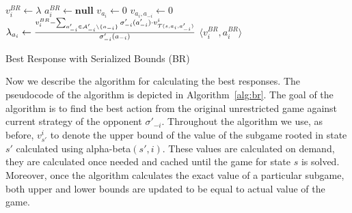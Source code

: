 \begin{algorithm2e}[t]
\small
{}
$v^{BR}_i \leftarrow \lambda$ \;
$a_i^{BR} \leftarrow \textbf{null}$ \;
 {%
	$v_{a_i} \leftarrow 0$\;
	 {\label{alg:br:opp}
    $v_{a_i,a_{-i}} \leftarrow 0$\;
		$\lambda_{a_i} \leftarrow \frac{v_i^{BR} - \sum_{a'_{-i} \in \mathcal{A}'_{-i} \setminus \lbrace a_{-i} \rbrace} \sigma'_{-i}(a'_{-i}) \cdot v^i_{\mathcal{T}(s,a_i,a'_{-i})}}{\sigma'_{-i}(a_{-i})}$\; \label{alg:br:bound}
	}
}
\Return $\langle v_i^{BR}, a_i^{BR} \rangle$
\caption{Best Response with Serialized Bounds (BR)}\label{alg:br}
\end{algorithm2e}

Now we describe the algorithm for calculating the best responses.
The pseudocode of the algorithm is depicted in Algorithm~\ref{alg:br}.
The goal of the algorithm is to find the best action from the original unrestricted game against current strategy of the opponent $\sigma'_{-i}$.
Throughout the algorithm we use, as before, $v^i_{s'}$ to denote the upper bound of the value of the subgame rooted in state $s'$ calculated using alpha-beta$(s',i)$. These values are calculated on demand, \ie they are calculated once needed and cached until the game for state $s$ is solved.
Moreover, once the algorithm calculates the exact value of a particular subgame, both upper and lower bounds are updated to be equal to actual value of the game.

